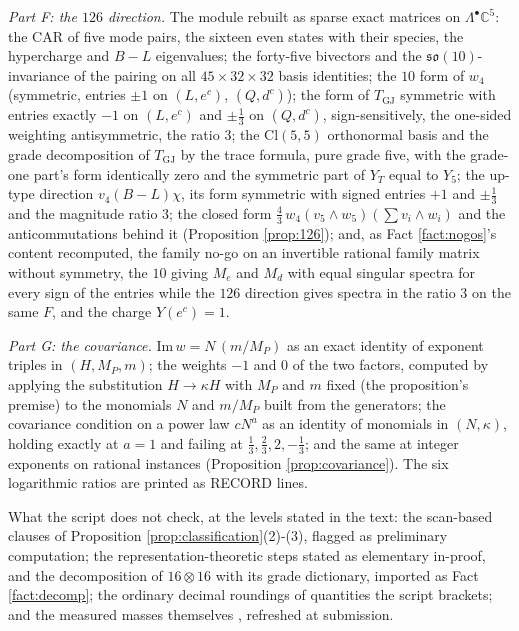 \documentclass[11pt]{article}
\theoremstyle{definition}
\newcommand{\Cl}{\mathrm{Cl}}
\newcommand{\C}{\mathbb{C}}
\newcommand{\so}{\mathfrak{so}}
\begin{document}
\emph{Part F: the $126$ direction.} The module rebuilt as sparse exact matrices on $\Lambda^{\bullet}\C^{5}$: the CAR of five mode pairs, the sixteen even states with their species, the hypercharge and $B - L$ eigenvalues; the forty-five bivectors and the $\so(10)$-invariance of the pairing on all $45 \times 32 \times 32$ basis identities; the $10$ form of $w_{4}$ (symmetric, entries $\pm 1$ on $(L, e^{c})$, $(Q, d^{c})$); the form of $T_{\mathrm{GJ}}$ symmetric with entries exactly $-1$ on $(L, e^{c})$ and $\pm\tfrac13$ on $(Q, d^{c})$, sign-sensitively, the one-sided weighting antisymmetric, the ratio $3$; the $\Cl(5,5)$ orthonormal basis and the grade decomposition of $T_{\mathrm{GJ}}$ by the trace formula, pure grade five, with the grade-one part's form identically zero and the symmetric part of $Y_{T}$ equal to $Y_{5}$; the up-type direction $v_{4}(B - L)\chi$, its form symmetric with signed entries $+1$ and $\pm\tfrac13$ and the magnitude ratio $3$; the closed form $\tfrac43\,w_{4}(v_{5} \wedge w_{5})(\sum v_{i} \wedge w_{i})$ and the anticommutations behind it (Proposition \ref{prop:126}); and, as Fact \ref{fact:nogos}'s content recomputed, the family no-go on an invertible rational family matrix without symmetry, the $10$ giving $M_{e}$ and $M_{d}$ with equal singular spectra for every sign of the entries while the $126$ direction gives spectra in the ratio $3$ on the same $F$, and the charge $Y(e^{c}) = 1$.

\emph{Part G: the covariance.} $\mathrm{Im}\,w = N\,(m/M_{P})$ as an exact identity of exponent triples in $(H, M_{P}, m)$; the weights $-1$ and $0$ of the two factors, computed by applying the substitution $H \to \kappa H$ with $M_{P}$ and $m$ fixed (the proposition's premise) to the monomials $N$ and $m/M_{P}$ built from the generators; the covariance condition on a power law $cN^{a}$ as an identity of monomials in $(N, \kappa)$, holding exactly at $a = 1$ and failing at $\tfrac13, \tfrac23, 2, -\tfrac13$; and the same at integer exponents on rational instances (Proposition \ref{prop:covariance}). The six logarithmic ratios are printed as RECORD lines.

What the script does not check, at the levels stated in the text: the scan-based clauses of Proposition \ref{prop:classification}(2)-(3), flagged as preliminary computation; the representation-theoretic steps stated as elementary in-proof, and the decomposition of $16 \otimes 16$ with its grade dictionary, imported as Fact \ref{fact:decomp}; the ordinary decimal roundings of quantities the script brackets; and the measured masses themselves \cite{PDG2024}, refreshed at submission.
\end{document}

